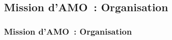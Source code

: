 \subsection{Mission d'AMO~: Organisation}
\begin{frame}
	\frametitle{Mission d'AMO~: Organisation}
\end{frame}

